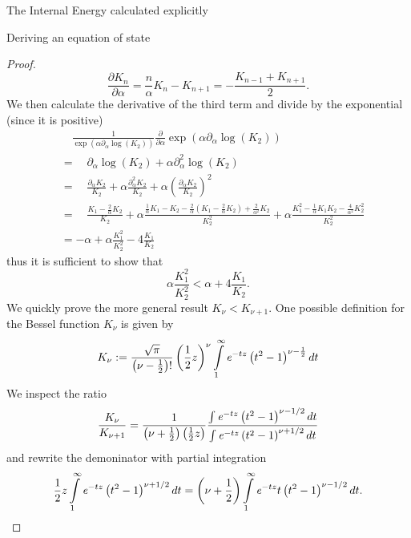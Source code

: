 \begin{section}{The Internal Energy calculated explicitly}
\begin{subsection}{Deriving an equation of state}
\begin{proof}
	\begin{equation}
		\frac{\partial K_n}{\partial\alpha} = \frac{n}{\alpha}K_n-K_{n+1} = -\frac{K_{n-1}+K_{n+1}}{2}.
		\label{2-IntEner-BesselDerivative}
	\end{equation}
	We then calculate the derivative of the third term and divide by the exponential (since it is positive)
	\begin{align}
		&\hspace{1em} \frac{1}{\exp(\alpha\partial_\alpha\log(K_2))}\frac{\partial}{\partial\alpha}\exp(\alpha\partial_\alpha\log(K_2))\\
		&= \hspace{1em} \partial_\alpha\log(K_2) + \alpha\partial^2_\alpha\log(K_2)\\
		&= \hspace{1em} \frac{\partial_\alpha K_2}{K_2} + \alpha\frac{\partial^2_\alpha K_2}{K_2} + \alpha\left(\frac{\partial_\alpha K_2}{K_2}\right)^2\\
		&= \hspace{1em} \frac{K_1-\frac{2}{\alpha}K_2}{K_2} + \alpha\frac{\frac{1}{\alpha}K_1-K_2-\frac{2}{\alpha}\left(K_1-\frac{2}{\alpha}K_2\right)+\frac{2}{\alpha^2}K_2}{K_2^2} + \alpha\frac{K_1^2-\frac{1}{\alpha}K_1K_2-\frac{4}{\alpha^2}K_2^2}{K_2^2}\\
		&= -\alpha + \alpha\frac{K_1^2}{K_2^2} - 4\frac{K_1}{K_2}
	\end{align}
	thus it is sufficient to show that
	\begin{equation}
		\alpha\frac{K_1^2}{K_2^2}  < \alpha + 4\frac{K_1}{K_2}.
	\end{equation}
	We quickly prove the more general result $K_\nu<K_{\nu+1}$. One possible definition\cite{weissteinModifiedBesselFunctiona} for the Bessel function $K_\nu$ is given by
	\begin{equation}
		K_\nu := \frac{\sqrt{\pi}}{\left(\nu-\frac{1}{2}\right)!}\left(\frac{1}{2}z\right)^\nu\int\limits_1^\infty\mathit{e}^{-tz}\left(t^2-1\right)^{\nu-\frac{1}{2}}dt
	\end{equation}
	We inspect the ratio
	\begin{equation}
		\frac{K_\nu}{K_{\nu+1}} = \frac{1}{\left(\nu+\frac{1}{2}\right)\left(\frac{1}{2}z\right)}\frac{\int\mathit{e}^{-tz}\left(t^2-1\right)^{\nu-1/2}dt}{\int\mathit{e}^{-tz}\left(t^2-1\right)^{\nu+1/2}dt}
	\end{equation}
	and rewrite the demoninator with partial integration
	\begin{equation}
		 \frac{1}{2}z\int\limits_1^\infty\e^{-tz}\left(t^2-1\right)^{\nu+1/2}dt = \left(\nu+\frac{1}{2}\right)\int\limits_1^\infty \e^{-tz}t\left(t^2-1\right)^{\nu-1/2}dt.

\end{equation}
\end{proof}
\end{subsection}
\end{section}
